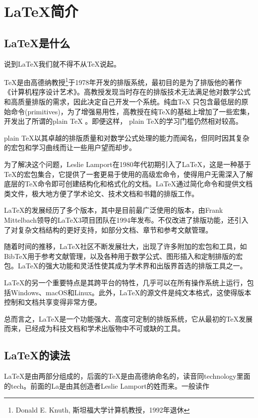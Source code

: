 \chapter{\LaTeX  简介}
\section{\LaTeX 是什么}
说到\LaTeX 我们就不得不从\TeX 说起。

\TeX 是由高德纳教授\footnote{Donald E. Knuth,
	斯坦福大学计算机教授，1992年退休}于1978年开发的排版系统，最初目的是为了排版他的著作《计算机程序设计艺术》。高教授发现当时存在的排版技术无法满足他对数学公式和高质量排版的需求，因此决定自己开发一个系统。纯血\TeX
只包含最低层的原始命令(primitives)，为了增强易用性，高教授在纯\TeX 的基础上增加了一些宏集，开发出了所谓的plain \TeX
。即便这样，
plain \TeX 的学习门槛仍然相对较高。

plain \TeX 以其卓越的排版质量和对数学公式处理的能力而闻名，但同时因其复杂的宏包和学习曲线而让一些用户望而却步。

为了解决这个问题，Leslie Lamport在1980年代初期引入了\LaTeX ，这是一种基于\TeX 的宏包集合，它提供了一套更易于使用的高级宏命令，使得用户无需深入了解底层的\TeX 命令即可创建结构化和格式化的文档。\LaTeX 通过简化命令和提供文档类文件，极大地方便了学术论文、技术文档和书籍的排版工作。

\LaTeX 的发展经历了多个版本，其中\LaTeXe 是目前最广泛使用的版本，由Frank Mittelbach领导的\LaTeX 3项目团队在1994年发布。\LaTeXe 不仅改进了排版功能，还引入了对复杂文档结构的更好支持，如部分文档、章节和参考文献管理。

随着时间的推移，\LaTeX 社区不断发展壮大，出现了许多附加的宏包和工具，如BibTeX用于参考文献管理，以及各种用于数学公式、图形插入和定制排版的宏包。\LaTeX 的强大功能和灵活性使其成为学术界和出版界首选的排版工具之一。

\LaTeX 的另一个重要特点是其跨平台的特性，几乎可以在所有操作系统上运行，包括Windows、macOS和Linux。此外，\LaTeX 的源文件是纯文本格式，这使得版本控制和文档共享变得非常方便。

总而言之，\LaTeX 是一个功能强大、高度可定制的排版系统，它从最初的\TeX 发展而来，已经成为科技文档和学术出版物中不可或缺的工具。

\section{\LaTeX 的读法}
\LaTeX 是由两部分组成的，后面的\TeX 是由高德纳命名的，读音同technology里面的tech。前面的La是由其创造者Leslie
Lamport的姓而来。一般读作

